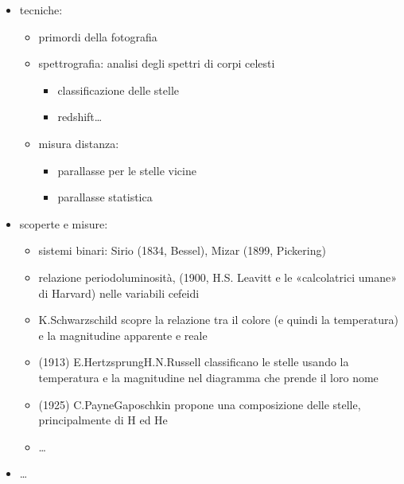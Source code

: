 \documentclass[letterpaper,10pt,italian]{jupyterBook}
\begin{document}
\sphinxAtStartPar
{}
\begin{itemize}
\item {} 
\sphinxAtStartPar
tecniche:
\begin{itemize}
\item {} 
\sphinxAtStartPar
primordi della fotografia

\item {} 
\sphinxAtStartPar
spettrografia: analisi degli spettri di corpi celesti
\begin{itemize}
\item {} 
\sphinxAtStartPar
classificazione delle stelle

\item {} 
\sphinxAtStartPar
redshift…

\end{itemize}

\item {} 
\sphinxAtStartPar
misura distanza:
\begin{itemize}
\item {} 
\sphinxAtStartPar
parallasse per le stelle vicine

\item {} 
\sphinxAtStartPar
parallasse statistica

\end{itemize}

\end{itemize}

\item {} 
\sphinxAtStartPar
scoperte e misure:
\begin{itemize}
\item {} 
\sphinxAtStartPar
sistemi binari: Sirio (1834, Bessel), Mizar (1899, Pickering)

\item {} 
\sphinxAtStartPar
relazione periodo\sphinxhyphen{}luminosità, (1900, H.S. Leavitt e le «calcolatrici umane» di Harvard) nelle variabili cefeidi

\item {} 
\sphinxAtStartPar
K.Schwarzschild scopre la relazione tra il colore (e quindi la temperatura) e la magnitudine apparente e reale

\item {} 
\sphinxAtStartPar
(1913) E.Hertzsprung\sphinxhyphen{}H.N.Russell classificano le stelle usando la temperatura e la magnitudine nel diagramma che prende il loro nome

\item {} 
\sphinxAtStartPar
(1925) C.Payne\sphinxhyphen{}Gaposchkin propone una composizione delle stelle, principalmente di H ed He

\item {} 
\sphinxAtStartPar
…

\end{itemize}

\item {} 
\sphinxAtStartPar
…

\end{itemize}
\end{document}
